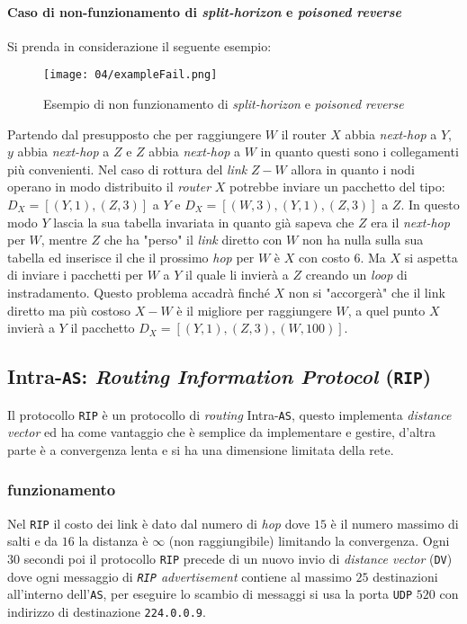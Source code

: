         \paragraph{Caso di non-funzionamento di \textit{split-horizon} e \textit{poisoned reverse}}
        Si prenda in considerazione il seguente esempio:
            \begin{figure}[H]
                \centering
                \texttt{[image: 04/exampleFail.png]}
                \caption{Esempio di non funzionamento di \textit{split-horizon} e \textit{poisoned reverse}}
            \end{figure}
        
        Partendo dal presupposto che per raggiungere $W$ il router $X$ abbia \textit{next-hop} a $Y$, $y$ abbia \textit{next-hop} a $Z$ e $Z$ abbia \textit{next-hop} a $W$ in quanto questi sono i collegamenti più convenienti.\newline
        Nel caso di rottura del \textit{link} $Z-W$ allora in quanto i nodi operano in modo distribuito il \textit{router} $X$ potrebbe inviare un pacchetto del tipo: $D_X=[(Y,1),(Z,3)]$ a $Y$ e $D_X=[(W,3),(Y,1),(Z,3)]$ a $Z$. In questo modo $Y$ lascia la sua tabella invariata in quanto già sapeva che $Z$ era il \textit{next-hop} per $W$, mentre $Z$ che ha "perso" il \textit{link} diretto con $W$ non ha nulla sulla sua tabella ed inserisce il che il prossimo \textit{hop} per $W$ è $X$ con costo $6$. Ma $X$ si aspetta di inviare i pacchetti per $W$ a $Y$ il quale li invierà a $Z$ creando un \textit{loop} di instradamento. Questo problema accadrà finché $X$ non si "accorgerà" che il link diretto ma più costoso $X-W$ è il migliore per raggiungere $W$, a quel punto $X$ invierà a $Y$ il pacchetto $D_X=[(Y,1),(Z,3),(W,100)]$. 
    \subsection{Intra-\texttt{AS}: \textit{Routing Information Protocol} (\texttt{RIP})}
        Il protocollo \texttt{RIP} è un protocollo di \textit{routing} Intra-\texttt{AS}, questo implementa \textit{distance vector} ed ha come vantaggio che è semplice da implementare e gestire, d'altra parte è a convergenza lenta e si ha una dimensione limitata della rete.
        \subsubsection{funzionamento} Nel \texttt{RIP} il costo dei link è dato dal numero di \textit{hop} dove $15$ è il numero massimo di salti e da $16$ la distanza è $\infty$ (non raggiungibile) limitando la convergenza. Ogni $30$ secondi poi il protocollo \texttt{RIP} precede di un nuovo invio di \textit{distance vector} (\texttt{DV}) dove ogni messaggio di \textit{\texttt{RIP} advertisement} contiene al massimo $25$ destinazioni all'interno dell'\texttt{AS}, per eseguire lo scambio di messaggi si usa la porta \texttt{UDP} $520$ con indirizzo di destinazione \texttt{224.0.0.9}.
